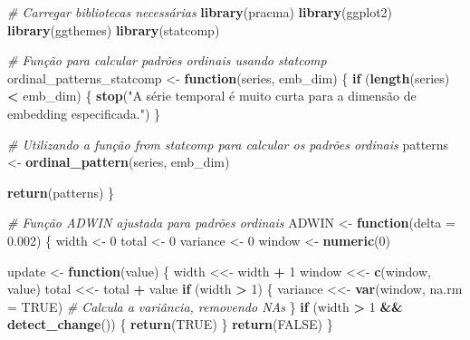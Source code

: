 \documentclass[
]{article}
\newenvironment{Shaded}{\begin{snugshade}}{\end{snugshade}}
\newcommand{\AttributeTok}[1]{\textcolor[rgb]{0.13,0.29,0.53}{#1}}
\newcommand{\CommentTok}[1]{\textcolor[rgb]{0.56,0.35,0.01}{\textit{#1}}}
\newcommand{\ConstantTok}[1]{\textcolor[rgb]{0.56,0.35,0.01}{#1}}
\newcommand{\ControlFlowTok}[1]{\textcolor[rgb]{0.13,0.29,0.53}{\textbf{#1}}}
\newcommand{\DecValTok}[1]{\textcolor[rgb]{0.00,0.00,0.81}{#1}}
\newcommand{\FloatTok}[1]{\textcolor[rgb]{0.00,0.00,0.81}{#1}}
\newcommand{\FunctionTok}[1]{\textcolor[rgb]{0.13,0.29,0.53}{\textbf{#1}}}
\newcommand{\NormalTok}[1]{#1}
\newcommand{\OtherTok}[1]{\textcolor[rgb]{0.56,0.35,0.01}{#1}}
\newcommand{\SpecialCharTok}[1]{\textcolor[rgb]{0.81,0.36,0.00}{\textbf{#1}}}
\newcommand{\StringTok}[1]{\textcolor[rgb]{0.31,0.60,0.02}{#1}}
\begin{document}
\begin{Shaded}
\begin{Highlighting}[]
\CommentTok{\# Carregar bibliotecas necessárias}
\FunctionTok{library}\NormalTok{(pracma)}
\FunctionTok{library}\NormalTok{(ggplot2)}
\FunctionTok{library}\NormalTok{(ggthemes)}
\FunctionTok{library}\NormalTok{(statcomp)}

\CommentTok{\# Função para calcular padrões ordinais usando statcomp}
\NormalTok{ordinal\_patterns\_statcomp }\OtherTok{\textless{}{-}} \ControlFlowTok{function}\NormalTok{(series, emb\_dim) \{}
  \ControlFlowTok{if}\NormalTok{ (}\FunctionTok{length}\NormalTok{(series) }\SpecialCharTok{\textless{}}\NormalTok{ emb\_dim) \{}
    \FunctionTok{stop}\NormalTok{(}\StringTok{"A série temporal é muito curta para a dimensão de embedding especificada."}\NormalTok{)}
\NormalTok{  \}}
  
  \CommentTok{\# Utilizando a função from \textasciigrave{}statcomp\textasciigrave{} para calcular os padrões ordinais}
\NormalTok{  patterns }\OtherTok{\textless{}{-}} \FunctionTok{ordinal\_pattern}\NormalTok{(series, emb\_dim)}
  
  \FunctionTok{return}\NormalTok{(patterns)}
\NormalTok{\}}

\CommentTok{\# Função ADWIN ajustada para padrões ordinais}
\NormalTok{ADWIN }\OtherTok{\textless{}{-}} \ControlFlowTok{function}\NormalTok{(}\AttributeTok{delta =} \FloatTok{0.002}\NormalTok{) \{}
\NormalTok{  width }\OtherTok{\textless{}{-}} \DecValTok{0}
\NormalTok{  total }\OtherTok{\textless{}{-}} \DecValTok{0}
\NormalTok{  variance }\OtherTok{\textless{}{-}} \DecValTok{0}
\NormalTok{  window }\OtherTok{\textless{}{-}} \FunctionTok{numeric}\NormalTok{(}\DecValTok{0}\NormalTok{)}
  
\NormalTok{  update }\OtherTok{\textless{}{-}} \ControlFlowTok{function}\NormalTok{(value) \{}
\NormalTok{    width }\OtherTok{\textless{}\textless{}{-}}\NormalTok{ width }\SpecialCharTok{+} \DecValTok{1}
\NormalTok{    window }\OtherTok{\textless{}\textless{}{-}} \FunctionTok{c}\NormalTok{(window, value)}
\NormalTok{    total }\OtherTok{\textless{}\textless{}{-}}\NormalTok{ total }\SpecialCharTok{+}\NormalTok{ value}
    \ControlFlowTok{if}\NormalTok{ (width }\SpecialCharTok{\textgreater{}} \DecValTok{1}\NormalTok{) \{}
\NormalTok{      variance }\OtherTok{\textless{}\textless{}{-}} \FunctionTok{var}\NormalTok{(window, }\AttributeTok{na.rm =} \ConstantTok{TRUE}\NormalTok{) }\CommentTok{\# Calcula a variância, removendo NAs}
\NormalTok{    \}}
    \ControlFlowTok{if}\NormalTok{ (width }\SpecialCharTok{\textgreater{}} \DecValTok{1} \SpecialCharTok{\&\&} \FunctionTok{detect\_change}\NormalTok{()) \{}
      \FunctionTok{return}\NormalTok{(}\ConstantTok{TRUE}\NormalTok{)}
\NormalTok{    \}}
    \FunctionTok{return}\NormalTok{(}\ConstantTok{FALSE}\NormalTok{)}
\NormalTok{  \}}
  

\end{Highlighting}
\end{Shaded}
\end{document}
